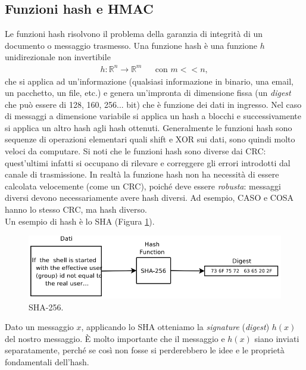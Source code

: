 \subsection{Funzioni hash e HMAC}
Le funzioni hash risolvono il problema della garanzia di integrità di un documento o messaggio trasmesso. Una funzione hash è una funzione $h$ unidirezionale non invertibile
\begin{eqnarray*}
h:\mathbb{R}^n\to\mathbb{R}^m & & \text{con } m << n\text{,}\
\end{eqnarray*}
che si applica ad un'informazione (qualsiasi informazione in binario, una email, un pacchetto, un file, etc.) e genera un'impronta di dimensione fissa (un \textit{digest} che può essere di 128, 160, 256... bit) che è funzione dei dati in ingresso. Nel caso di messaggi a dimensione variabile si applica un hash a blocchi e successivamente si applica un altro hash agli hash ottenuti. Generalmente le funzioni hash sono sequenze di operazioni elementari quali shift e XOR sui dati, sono quindi molto veloci da computare. Si noti che le funzioni hash sono diverse dai CRC: quest'ultimi infatti si occupano di rilevare e correggere gli errori introdotti dal canale di trasmissione. In realtà la funzione hash non ha necessità di essere calcolata velocemente (come un CRC), poiché deve essere \textit{robusta}: messaggi diversi devono necessariamente avere hash diversi. Ad esempio, CASO e COSA hanno lo stesso CRC, ma hash diverso.\\
Un esempio di hash è lo SHA (Figura \ref{img:SHA}).
\begin{figure}[htbp]
	\centering
	\includegraphics[scale = 0.5]{images/SHA}
	\caption{SHA-256.}
	\label{img:SHA}
\end{figure}
Dato un messaggio $x$, applicando lo SHA otteniamo la \textit{signature} (\textit{digest}) $h(x)$ del nostro messaggio. È molto importante che il messaggio e $h(x)$ siano inviati separatamente, perché se così non fosse si perderebbero le idee e le proprietà fondamentali dell'hash.
